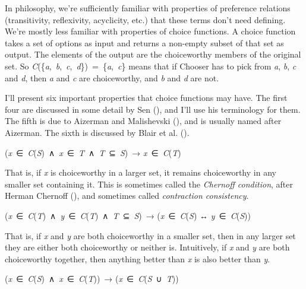 \documentclass[
  11pt,
  letterpaper,
  DIV=11,
  numbers=noendperiod,
  twoside]{scrartcl}
\providecommand{\tightlist}{%
  \setlength{\itemsep}{0pt}\setlength{\parskip}{0pt}}
\begin{document}
In philosophy, we're sufficiently familiar with properties of preference
relations (transitivity, reflexivity, acyclicity, etc.) that these terms
don't need defining. We're mostly less familiar with properties of
choice functions. A choice function takes a set of options as input and
returns a non-empty subset of that set as output. The elements of the
output are the choiceworthy members of the original set. So
\emph{C}(\{\emph{a},~\emph{b},~\emph{c},~\emph{d}\})~=~\{\emph{a},~\emph{c}\}
means that if Chooser has to pick from \emph{a}, \emph{b}, \emph{c} and
\emph{d}, then \emph{a} and \emph{c} are choiceworthy, and \emph{b} and
\emph{d} are not.

I'll present six important properties that choice functions may have.
The first four are discussed in some detail by Sen
(), and I'll use his
terminology for them. The fifth is due to Aizerman and Malishevski
(), and is usually named after
Aizerman. The sixth is discussed by Blair et al.
().

\begin{description}
\tightlist
\item[Property α]
(\emph{x}~∈~\emph{C}(\emph{S})~∧~\emph{x}~∈~\emph{T}~∧~\emph{T}~⊆~\emph{S})~→
\emph{x}~∈~\emph{C}(\emph{T})
\end{description}

That is, if \emph{x} is choiceworthy in a larger set, it remains
choiceworthy in any smaller set containing it. This is sometimes called
the \emph{Chernoff condition}, after Herman Chernoff
(), and sometimes called
\emph{contraction consistency}.

\begin{description}
\tightlist
\item[Property β]
(\emph{x}~∈~\emph{C}(\emph{T})~∧~\emph{y}~∈~\emph{C}(\emph{T})~∧~\emph{T}~⊆~\emph{S})~→
(\emph{x}~∈~\emph{C}(\emph{S}) ↔ \emph{y}~∈~\emph{C}(\emph{S}))
\end{description}

That is, if \emph{x} and \emph{y} are both choiceworthy in a smaller
set, then in any larger set they are either both choiceworthy or neither
is. Intuitively, if \emph{x} and \emph{y} are both choiceworthy
together, then anything better than \emph{x} is also better than
\emph{y}.

\begin{description}
\tightlist
\item[Property γ]
(\emph{x}~∈~\emph{C}(\emph{S})~∧~\emph{x}~∈~\emph{C}(\emph{T}))~→
(\emph{x}~∈~\emph{C}(\emph{S}~∪~\emph{T}))
\end{description}
\end{document}
